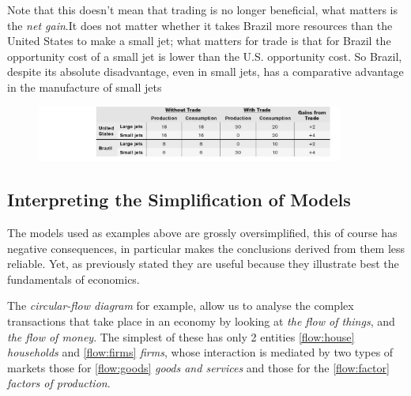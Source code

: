 \documentclass[english,course, draft]{Notes}
\newcommand{\ita}[1]{\textit{#1}}
\begin{document}
\par{Note that this doesn't mean that trading is no longer beneficial, what matters is the \ita{net gain}.It
does not matter whether it takes Brazil more resources than the United States to make a small jet; what matters for trade is that for Brazil the opportunity cost of a small jet is lower than the U.S. opportunity cost. So Brazil, despite its absolute
disadvantage, even in small jets, has a comparative advantage in the manufacture of small jets}

\begin{figure}[ht]
\centering
\includegraphics[width=0.9\textwidth]{jetsTrade2}
\end{figure}

\subsection{Interpreting the Simplification of Models}
\par{The models used as examples above are grossly oversimplified, this of course has negative consequences, in particular makes the conclusions derived from them less reliable. Yet, as previously stated they are useful because they  illustrate best the fundamentals of economics.}

\par{The \ita{circular-flow diagram} for example, allow us to analyse the complex transactions that take place in an economy by looking at \ita{the flow of things}, and \ita{the flow of money}. The simplest of these has only 2 entities  \ref{flow:house} \ita{households} and \ref{flow:firms} \ita{firms}, whose interaction is mediated by two types of markets those for \ref{flow:goods} \ita{goods and services} and those for the \ref{flow:factor} \ita{factors of production}.}

\newpage
\end{document}
